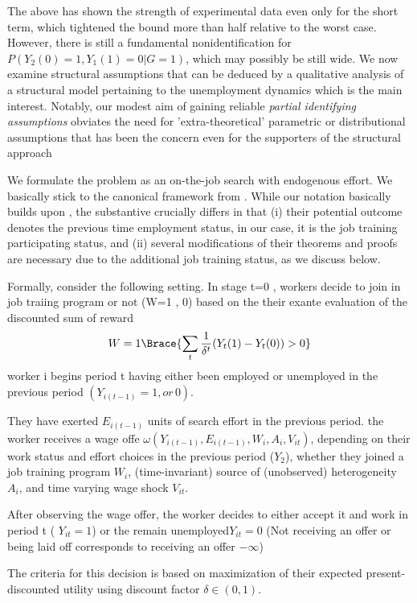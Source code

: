 \documentclass[uplatex,dvipdfmx]{jsarticle}
\begin{document}
The above has shown the strength of experimental data even only for the short term, which tightened the bound more than half relative to the worst case. However, there is still a fundamental nonidentification for $P( Y_2(0) =1, Y_1(1)=0|G=1) $, which may possibly be still wide. We now examine structural assumptions that can be
deduced by a qualitative analysis of a structural model pertaining to the unemployment dynamics which is the main interest. 
Notably, our modest aim of gaining reliable \textit{partial identifying assumptions} obviates the need for 'extra-theoretical' parametric or distributional assumptions that has been the concern even for the supporters of the structural approach\cite{keane2011structural,todd2020best}

We formulate the problem as an on-the-job search with endogenous effort. We basically stick to the canonical framework from \cite{faberman2022job,mortensen1999new,torgovitsky2019nonparametric}. While our notation basically builds upon \cite{torgovitsky2019nonparametric} , 
the substantive crucially differs in that (i) their potential outcome denotes the previous time employment status, in our case, it is the job training participating status, and (ii) several modifications of their theorems and proofs are necessary due to the additional job training status, as we discuss below.

Formally, consider the following setting. In stage t=0 , workers decide to join in job traiing program or not (W=1 , 0) based  on the their exante evaluation of the discounted sum of reward 
\[W = 1 \Brace{ \sum_t \frac{ 1} { \delta^t }(Y_t( 1) - Y_t(0))  >0} \]
worker i begins period t having
 either been employed or unemployed in the previous period $( Y_{ i (t-1) } =1 , or \,0) $.
 
They have exerted $E_{i (t-1) } $ units of search effort in the previous period. the worker receives a wage offe $ \omega ( Y_{i (t-1) } , E_{ i (t-1) } ,W_i, A_i , V_{it} ) $, depending  on their work status  and effort choices in the previous period ($Y_2$), whether they joined a job training program $W_i$, 
(time-invariant) source of (unobserved) heterogeneity $ A_i$, and time varying wage shock $V_{it}$. 

After observing the wage offer, the worker decides to either accept it and work in period t ( $Y_{it} =1$) or the remain unemployed$ Y_{it} =0 $ (Not receiving an offer or being laid off corresponds to receiving an offer $  - \infty$)

The criteria for this decision is based on maximization of their expected present-discounted utility using discount factor $\delta \in (0,1)$.
\end{document}
